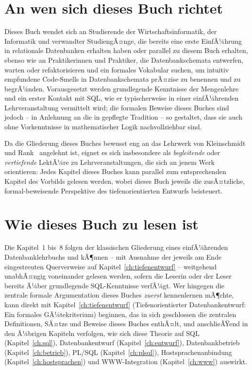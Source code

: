 ﻿\documentclass[a4paper,12pt]{report}
\theoremstyle{definition}
\theoremstyle{remark}
\begin{document}
\section*{An wen sich dieses Buch richtet}

Dieses Buch wendet sich an Studierende der Wirtschaftsinformatik,
der Informatik und verwandter StudiengÃ¤nge, die bereits eine erste
EinfÃ¼hrung in relationale Datenbanken erhalten haben oder parallel
zu diesem Buch erhalten, ebenso wie an Praktikerinnen und Praktiker,
die Datenbankschemata entwerfen, warten oder refaktorisieren und ein
formales Vokabular suchen, um intuitiv empfundene
\glqq Code-Smells\grqq{} in Datenbankschemata prÃ¤zise zu benennen und
zu begrÃ¼nden. Vorausgesetzt werden grundlegende Kenntnisse der
Mengenlehre und ein erster Kontakt mit SQL, wie er typischerweise in
einer einfÃ¼hrenden Lehrveranstaltung vermittelt wird; die formalen
Beweise dieses Buches sind jedoch -- in Anlehnung an die in
\cite{Cormen2009} gepflegte Tradition -- so gestaltet, dass sie auch
ohne Vorkenntnisse in mathematischer Logik nachvollziehbar sind.

Da die Gliederung dieses Buches bewusst eng an das Lehrwerk von
Kleinschmidt und Rank~\cite{Kleinschmidt2002} angelehnt ist, eignet es
sich insbesondere als \emph{begleitende} oder \emph{vertiefende}
LektÃ¼re zu Lehrveranstaltungen, die sich an jenem Werk orientieren:
Jedes Kapitel dieses Buches kann parallel zum entsprechenden Kapitel
des Vorbilds gelesen werden, wobei dieses Buch jeweils die zusÃ¤tzliche,
formal-beweisende Perspektive des tiefenorientierten Entwurfs
beisteuert.

\section*{Wie dieses Buch zu lesen ist}

Die Kapitel~1 bis~8 folgen der klassischen Gliederung eines
einfÃ¼hrenden Datenbanklehrbuchs und kÃ¶nnen -- mit Ausnahme der jeweils
am Ende eingestreuten Querverweise auf Kapitel~\ref{ch:tiefenentwurf}
-- weitgehend unabhÃ¤ngig voneinander gelesen werden, sofern die
Leserin oder der Leser bereits Ã¼ber grundlegende SQL-Kenntnisse
verfÃ¼gt. Wer hingegen die zentrale formale Argumentation dieses
Buches \emph{zuerst} kennenlernen mÃ¶chte, kann direkt mit
Kapitel~\ref{ch:tiefenentwurf} (\glqq Tiefenorientierter
Datenbankentwurf: Ein formales GÃ¼tekriterium\grqq{}) beginnen, das in
sich geschlossen die zentralen Definitionen, SÃ¤tze und Beweise dieses
Buches enthÃ¤lt, und anschlieÃŸend in den Ã¼brigen Kapiteln verfolgen,
wie sich diese Theorie auf SQL (Kapitel~\ref{ch:sql}),
Datenbankentwurf (Kapitel~\ref{ch:entwurf}), Datenbankbetrieb
(Kapitel~\ref{ch:betrieb}), PL/SQL (Kapitel~\ref{ch:plsql}),
Hostsprachenanbindung (Kapitel~\ref{ch:hostsprachen}) und
WWW-Integration (Kapitel~\ref{ch:www}) auswirkt.
\end{document}
